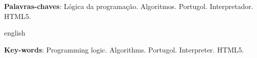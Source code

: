 

\begin{resumo}

\vspace{\onelineskip}
\textbf{Palavras-chaves}: Lógica da programação. Algoritmos. Portugol. Interpretador. HTML5.
\end{resumo}

\begin{resumo}[Abstract]
\begin{otherlanguage*}{english}

\vspace{\onelineskip}
\textbf{Key-words}: Programming logic. Algorithms. Portugol. Interpreter. HTML5.
\end{otherlanguage*}
\end{resumo}
